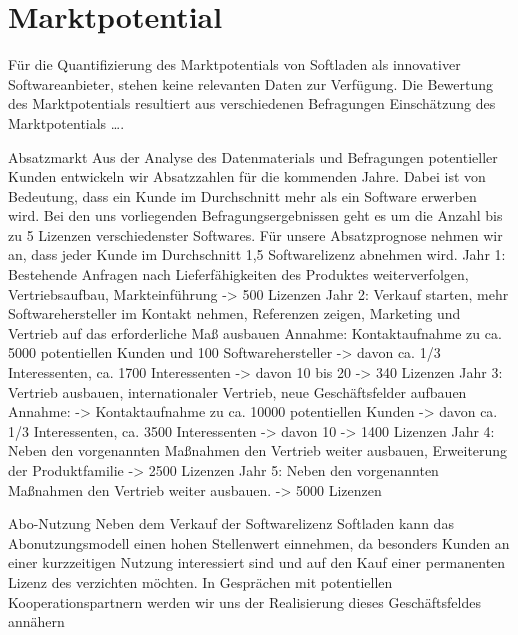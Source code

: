 \section{Marktpotential}
Für die Quantifizierung des Marktpotentials von Softladen als innovativer Softwareanbieter, stehen keine relevanten Daten zur Verfügung. Die Bewertung des Marktpotentials resultiert aus verschiedenen Befragungen 
Einschätzung des Marktpotentials
….

Absatzmarkt
Aus der Analyse des Datenmaterials und Befragungen potentieller Kunden entwickeln wir
Absatzzahlen für die kommenden Jahre. Dabei ist von Bedeutung, dass ein Kunde im
Durchschnitt mehr als ein Software erwerben wird. Bei den uns vorliegenden Befragungsergebnissen
geht es um die Anzahl bis zu 5 Lizenzen verschiedenster Softwares. Für unsere Absatzprognose nehmen wir an, dass jeder Kunde im Durchschnitt 1,5 Softwarelizenz abnehmen
wird.
Jahr 1:
Bestehende Anfragen nach Lieferfähigkeiten des Produktes weiterverfolgen, Vertriebsaufbau, Markteinführung
-> 500 Lizenzen
Jahr 2:
Verkauf starten, mehr Softwarehersteller im Kontakt nehmen, Referenzen zeigen, Marketing und Vertrieb auf das erforderliche Maß ausbauen
Annahme:
Kontaktaufnahme zu ca. 5000 potentiellen Kunden und 100 Softwarehersteller
-> davon ca. 1/3 Interessenten, ca. 1700 Interessenten
-> davon 10 bis 20%
-> 340 Lizenzen
Jahr 3:
Vertrieb ausbauen, internationaler Vertrieb, neue Geschäftsfelder aufbauen
Annahme: 
-> Kontaktaufnahme zu ca. 10000 potentiellen Kunden
-> davon ca. 1/3 Interessenten, ca. 3500 Interessenten
-> davon 10%
-> 1400 Lizenzen
Jahr 4:
Neben den vorgenannten Maßnahmen den Vertrieb weiter ausbauen, Erweiterung der
Produktfamilie
-> 2500 Lizenzen
Jahr 5:
Neben den vorgenannten Maßnahmen den Vertrieb weiter ausbauen.
-> 5000 Lizenzen

Abo-Nutzung
Neben dem Verkauf der Softwarelizenz Softladen kann das Abonutzungsmodell einen hohen Stellenwert einnehmen, da besonders Kunden an einer kurzzeitigen Nutzung interessiert sind und auf
den Kauf einer permanenten Lizenz des verzichten möchten.
In Gesprächen mit potentiellen Kooperationspartnern werden wir uns der Realisierung dieses Geschäftsfeldes annähern 

